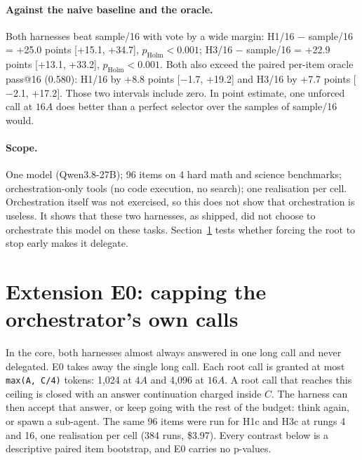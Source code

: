\documentclass[11pt]{article}
\begin{document}
\paragraph{Against the naive baseline and the oracle.} Both harnesses beat sample/16 with vote by a wide
margin: H1/16 $-$ sample/16 = +25.0 points
[+15.1, +34.7], $p_{\text{Holm}}
< 0.001$; H3/16 $-$ sample/16 = +22.9 points
[+13.1, +33.2], $p_{\text{Holm}}
< 0.001$. Both also exceed the paired per-item oracle pass@16
(0.580): H1/16 by +8.8 points
[$-$1.7, +19.2] and H3/16 by
+7.7 points [$-$2.1,
+17.2]. Those two intervals include zero. In point estimate, one unforced call at $16A$ does better than a
perfect selector over the samples of sample/16 would.

\paragraph{Scope.} One model (Qwen3.8-27B); 96 items on 4 hard math and
science benchmarks; orchestration-only tools (no code execution, no search); one realisation per cell.
Orchestration itself was not exercised, so this does not show that orchestration is useless. It shows that these
two harnesses, as shipped, did not choose to orchestrate this model on these tasks.
Section~\ref{sec:e0} tests whether forcing the root to stop early makes it delegate.

\section{Extension E0: capping the orchestrator's own calls}\label{sec:e0}

In the core, both harnesses almost always answered in one long call and never delegated. E0 takes away the
single long call. Each root call is granted at most \texttt{max(A, C/4)} tokens: 1,024 at $4A$ and 4,096
at $16A$. A root call that reaches this ceiling is closed with an answer continuation charged inside $C$. The
harness can then accept that answer, or keep going with the rest of the budget: think again, or spawn a
sub-agent. The same 96 items were run for H1c and H3c at rungs 4 and 16, one realisation per cell
(384 runs, \$3.97). Every contrast below is a descriptive paired item bootstrap, and E0
carries no p-values.
\end{document}
